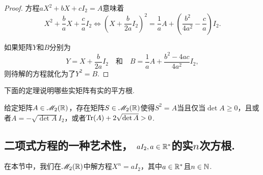 \begin{proof}
  方程$aX^2+bX+cI_2=A$意味着
  \[
    X^2 + \frac baX + \frac caI_2 \Leftrightarrow
    \left( X + \frac b{2a}I_2 \right)^2 =
    \frac1aA + \left( \frac{b^2}{4a^2} - \frac ca \right)I_2.
  \]

  如果矩阵$Y$和$B$分别为
  \[
    Y = X + \frac b{2a}I_2 \quad \text{和} \quad
    B = \frac1aA + \frac{b^2-4ac}{4a^2}I_2,
  \]
  则待解的方程就化为了$Y^2=B$.
\end{proof}

下面的定理说明哪些实矩阵有实的平方根.

\begin{theorem}
  \cite{4} 给定矩阵$A\in\mathscr M_2(\mathbb R)$，存在矩阵$S\in\mathscr M_2(\mathbb R)$使得$S^2=A$当且仅当$\det A\ge0$，且或者$A=-\sqrt{\det A}I_2$，或者$\operatorname{Tr}(A)+2\sqrt{\det A}>0$. %
\end{theorem}

\subsection{二项式方程的一种艺术性， $aI_2,a\in\mathbb R^\ast$的实$n$次方根.}

在本节中，我们在$\mathscr M_2(\mathbb R)$中解方程$X^n=aI_2$，其中$a\in\mathbb R^\ast$且$n\in\mathbb N$.

